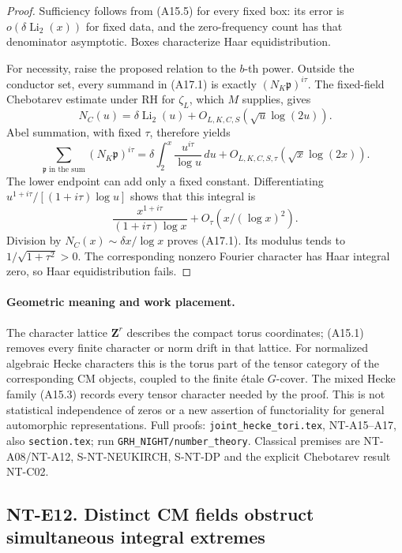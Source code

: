 \begin{proof}
Sufficiency follows from (A15.5) for every fixed box:
its error is \(o(\delta\operatorname{Li}_2(x))\) for fixed
data, and the zero-frequency count has that denominator
asymptotic. Boxes characterize Haar equidistribution.

For necessity, raise the proposed relation to the \(b\)-th
power. Outside the conductor set, every summand in (A17.1)
is exactly \((N_K\mathfrak p)^{i\tau}\).
The fixed-field Chebotarev estimate under RH for \(\zeta_L\),
which \(M\) supplies, gives
\[
 N_C(u)=\delta\operatorname{Li}_2(u)
                       +O_{L,K,C,S}(\sqrt u\log(2u)).
 \]
Abel summation, with fixed \(\tau\), therefore yields
\[
 \sum_{\mathfrak p\text{ in the sum}}
                  (N_K\mathfrak p)^{i\tau}
    =\delta\int_2^x\frac{u^{i\tau}}{\log u}\,du
                +O_{L,K,C,S,\tau}(\sqrt x\log(2x)).
 \]
The lower endpoint can add only a fixed constant.
Differentiating
\(u^{1+i\tau}/[(1+i\tau)\log u]\) shows that this integral is
\[
       \frac{x^{1+i\tau}}{(1+i\tau)\log x}
                         +O_\tau(x/(\log x)^2).
 \]
Division by \(N_C(x)\sim\delta x/\log x\) proves (A17.1).
Its modulus tends to \(1/\sqrt{1+\tau^2}>0\).
The corresponding nonzero Fourier character has Haar
integral zero, so Haar equidistribution fails.
\end{proof}

\paragraph{Geometric meaning and work placement.}
The character lattice \(\mathbf Z^r\) describes the
compact torus coordinates; (A15.1) removes every
finite character or norm drift in that lattice.
For normalized algebraic Hecke characters this is the
torus part of the tensor category of the corresponding
CM objects, coupled to the finite \'{e}tale \(G\)-cover.
The mixed Hecke family (A15.3) records every tensor
character needed by the proof. This is not statistical
independence of zeros or a new assertion of functoriality
for general automorphic representations.
Full proofs: \texttt{joint\_hecke\_tori.tex}, NT-A15--A17,
also \texttt{section.tex}; run
\texttt{GRH\_NIGHT/number\_theory}.
Classical premises are NT-A08/NT-A12, S-NT-NEUKIRCH,
S-NT-DP and the explicit Chebotarev result NT-C02.


\subsection*{NT-E12. Distinct CM fields obstruct simultaneous integral extremes}

